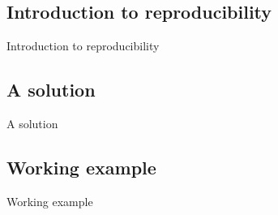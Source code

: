 \subsection[IntroRepro]{Introduction to reproducibility}
\begin{frame}
\huge{Introduction to reproducibility}
\end{frame}


\subsection[Solution]{A solution}
\begin{frame}
\huge{A solution}
\end{frame}


\subsection[Example]{Working example}
\begin{frame}
\huge{Working example}
\end{frame}


%

